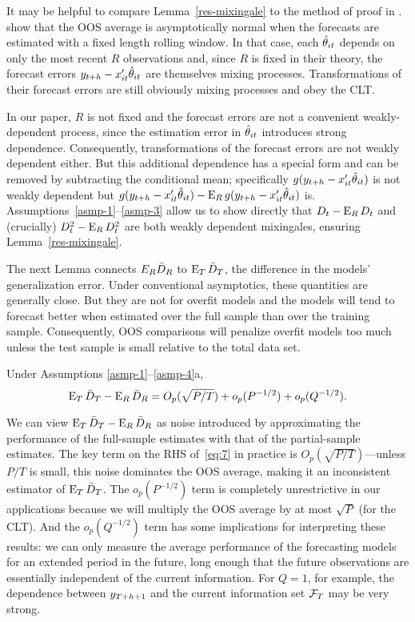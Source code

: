 It may be helpful to compare Lemma~\ref{res-mixingale} to the method
of proof in \citet{GiW:06}. \citet{GiW:06} show that the OOS average
is asymptotically normal when the forecasts are estimated with a fixed
length rolling window. In that case, each $\hat\theta_{it}$ depends on only
the most recent $R$ observations and, since $R$ is fixed in their
theory, the forecast errors $y_{t+h} - x_{it}'\hat\theta_{it}$ are themselves
mixing processes. Transformations of their forecast errors are
still obviously mixing processes and obey the CLT.

In our paper, $R$ is not fixed and the forecast errors are not a
convenient weakly-dependent process, since the estimation error in
$\hat\theta_{it}$ introduces strong dependence. Consequently,
transformations of the forecast errors are not weakly dependent
either. But this additional dependence has a special form and can be
removed by subtracting the conditional mean; specifically $g(y_{t+h} -
x_{it}'\hat\theta_{it})$ is not weakly dependent but $g(y_{t+h} -
x_{it}'\hat\theta_{it}) - \operatorname{E}_R g(y_{t+h} - x_{it}'\hat\theta_{it})$ is.
Assumptions~\ref{asmp-1}--\ref{asmp-3} allow us to show directly
that $D_t - \operatorname{E}_R D_t$ and (crucially) $D^2_t - \operatorname{E}_R D_t^2$ are both
weakly dependent mixingales, ensuring Lemma~\ref{res-mixingale}.

The next Lemma connects $E_R \bar{D}_{R}$ to $\operatorname{E}_T \bar{D}_{T}$, the difference in
the models' generalization error. Under conventional asymptotics,
these quantities are generally close. But they are not for overfit
models and the models will tend to forecast better when estimated over the
full sample than over the training sample. Consequently, OOS
comparisons will penalize overfit models too much unless the test
sample is small relative to the total data set.

\begin{lem} \label{res-convergence}
  Under Assumptions \ref{asmp-1}--\ref{asmp-4}a,
  \begin{equation}\label{eq:7}
    \operatorname{E}_T \bar{D}_{T} - \operatorname{E}_R \bar{D}_{R} = O_p(\sqrt{P/T}) + o_p(P^{-1/2})
    + o_p(Q^{-1/2}).
  \end{equation}
\end{lem}
We can view $\operatorname{E}_T \bar{D}_{T} - \operatorname{E}_R \bar{D}_{R}$ as noise introduced by
approximating the performance of the full-sample estimates with that
of the partial-sample estimates. The key term on the RHS
of~\eqref{eq:7} in practice is $O_p(\sqrt{P/T})$---unless $P/T$ is
small, this noise dominates the OOS average, making it an inconsistent
estimator of $\operatorname{E}_T \bar{D}_{T}$. The $o_p(P^{-1/2})$ term is completely
unrestrictive in our applications because we will multiply the OOS
average by at most $\sqrt{P}$ (for the CLT). And the $o_p(Q^{-1/2})$
term has some implications for interpreting these results: we can only
measure the average performance of the forecasting models for an
extended period in the future, long enough that the future
observations are essentially independent of the current
information. For $Q=1$, for example, the dependence between
$y_{T+h+1}$ and the current information set $\mathcal{F}_T$ may be very
strong.

